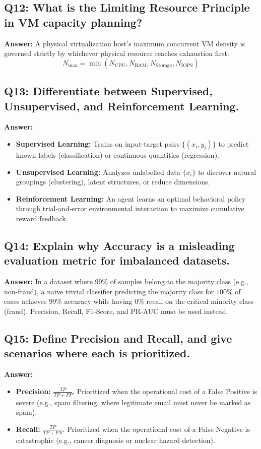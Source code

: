 \subsection*{Q12: What is the Limiting Resource Principle in VM capacity planning?}
\textbf{Answer:} A physical virtualization host's maximum concurrent VM density is governed strictly by whichever physical resource reaches exhaustion first:
\[
N_{\max} = \min(N_{\text{CPU}}, N_{\text{RAM}}, N_{\text{Storage}}, N_{\text{IOPS}})
\]

\subsection*{Q13: Differentiate between Supervised, Unsupervised, and Reinforcement Learning.}
\textbf{Answer:}
\begin{itemize}
    \item \textbf{Supervised Learning:} Trains on input-target pairs $\{ (x_i, y_i) \}$ to predict known labels (classification) or continuous quantities (regression).
    \item \textbf{Unsupervised Learning:} Analyzes unlabelled data $\{ x_i \}$ to discover natural groupings (clustering), latent structures, or reduce dimensions.
    \item \textbf{Reinforcement Learning:} An agent learns an optimal behavioral policy through trial-and-error environmental interaction to maximize cumulative reward feedback.
\end{itemize}

\subsection*{Q14: Explain why Accuracy is a misleading evaluation metric for imbalanced datasets.}
\textbf{Answer:} In a dataset where $99\%$ of samples belong to the majority class (e.g., non-fraud), a naive trivial classifier predicting the majority class for $100\%$ of cases achieves $99\%$ accuracy while having $0\%$ recall on the critical minority class (fraud). Precision, Recall, F1-Score, and PR-AUC must be used instead.

\subsection*{Q15: Define Precision and Recall, and give scenarios where each is prioritized.}
\textbf{Answer:}
\begin{itemize}
    \item \textbf{Precision:} $\frac{TP}{TP + FP}$. Prioritized when the operational cost of a False Positive is severe (e.g., spam filtering, where legitimate email must never be marked as spam).
    \item \textbf{Recall:} $\frac{TP}{TP + FN}$. Prioritized when the operational cost of a False Negative is catastrophic (e.g., cancer diagnosis or nuclear hazard detection).
\end{itemize}

